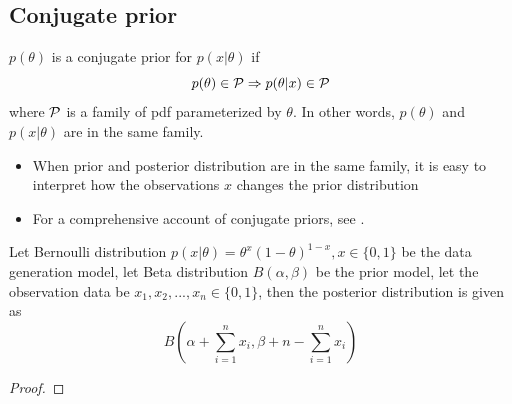 \begin{refsection}
\begin{lemma}
\end{lemma}

\subsection{Conjugate prior}
\begin{definition} 
	$p(\theta)$ is a conjugate prior for $p(x|\theta)$ if
	$$p(\theta) \in \mathcal{P} \Rightarrow p(\theta|x) \in \mathcal{P}$$
	where $\mathcal{P}$ is a family of pdf parameterized by $\theta$. In other words, $p(\theta)$ and $p(x|\theta)$ are in the same family.
\end{definition}

\begin{remark}\hfill
	\begin{itemize}
		\item When prior and posterior distribution are in the same family, it is easy to interpret how the observations $x$ changes the prior distribution
		\item For a comprehensive account of conjugate priors, see \cite{fink1997compendium}\cite{wiki:conjugateprior}.
	\end{itemize}
\end{remark}


\begin{lemma}[Bernoulli]
	Let Bernoulli distribution $p(x|\theta) = \theta^x(1-\theta)^{1-x},x\in \{0,1\}$ be the data generation model, let Beta distribution $B(\alpha,\beta)$ be the prior model, let the observation data be $x_1,x_2,...,x_n \in \{0,1\}$, then the posterior distribution is given as
	$$B(\alpha + \sum_{i=1}^n x_i,\beta + n - \sum_{i=1}^n x_i)$$
\end{lemma}
\begin{proof}
	
\end{proof}




\end{refsection}
